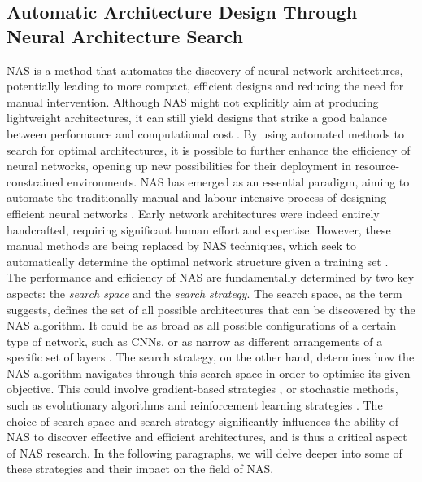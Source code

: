 
\subsection{Automatic Architecture Design Through Neural Architecture Search}\label{sec:sota:nas} 

\acf{NAS} is a method that automates the discovery of neural network
architectures, potentially leading to more compact, efficient designs and
reducing the need for manual intervention. Although \ac{NAS} might not
explicitly aim at producing lightweight architectures, it can still yield
designs that strike a good balance between performance and computational cost
\cite{DBLP:conf/cvpr/TanCPVSHL19,DBLP:conf/icml/TanL19}. By using automated
methods to search for optimal architectures, it is possible to further enhance
the efficiency of neural networks, opening up new possibilities for their
deployment in resource-constrained environments. \ac{NAS} has emerged as an
essential paradigm, aiming to automate the traditionally manual and
labour-intensive process of designing efficient neural networks
\cite{DBLP:journals/corr/MiikkulainenLMR17}. Early network architectures were
indeed entirely handcrafted, requiring significant human effort and expertise.
However, these manual methods are being replaced by \ac{NAS} techniques, which
seek to automatically determine the optimal network structure given a training
set \cite{DBLP:journals/corr/abs-2301-08727,elsken2019neural}.\\

The performance and efficiency of \ac{NAS} are fundamentally determined by two
key aspects: the \emph{search space} and the \emph{search strategy}. The search
space, as the term suggests, defines the set of all possible architectures that
can be discovered by the \ac{NAS} algorithm. It could be as broad as all
possible configurations of a certain type of network, such as \acp{CNN}, or as
narrow as different arrangements of a specific set of layers
\cite{DBLP:conf/cvpr/LiuCSAHY019}. The search strategy, on the other hand,
determines how the \ac{NAS} algorithm navigates through this search space in
order to optimise its given objective. This could involve gradient-based
strategies \cite{DBLP:conf/iclr/LiuSY19,DBLP:conf/iclr/XuX0CQ0X20}, or
stochastic methods, such as evolutionary algorithms and reinforcement learning
strategies \cite{DBLP:conf/iclr/ZophL17,DBLP:conf/icml/RealMSSSTLK17}. The
choice of search space and search strategy significantly influences the ability
of \ac{NAS} to discover effective and efficient architectures, and is thus a
critical aspect of NAS research. In the following paragraphs, we will delve
deeper into some of these strategies and their impact on the field of
\ac{NAS}.\\



